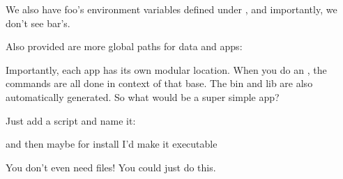 \documentclass[letterpaper,10pt,english]{sphinxmanual}
\begin{document}
We also have foo’s environment variables defined under  , and
importantly, we don’t see bar’s.

%
\begin{sphinxVerbatim}[commandchars=\\\{\}]
\end{sphinxVerbatim}

Also provided are more global paths for data and apps:

%
\begin{sphinxVerbatim}[commandchars=\\\{\}]

\end{sphinxVerbatim}

Importantly, each app has its own modular location. When you do an ,
the commands are all done in context of that base. The bin and lib are
also automatically generated. So what would be a super simple app?

Just add a script and name it:

%
\begin{sphinxVerbatim}[commandchars=\\\{\}]
 

       
\end{sphinxVerbatim}

and then maybe for install I’d make it executable

%
\begin{sphinxVerbatim}[commandchars=\\\{\}]
 

      
\end{sphinxVerbatim}

You don’t even need files! You could just do this.

%
\begin{sphinxVerbatim}[commandchars=\\\{\}]
 

       

      
\end{sphinxVerbatim}
\end{document}
